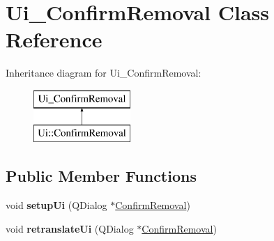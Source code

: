 \hypertarget{class_ui___confirm_removal}{}\section{Ui\+\_\+\+Confirm\+Removal Class Reference}
\label{class_ui___confirm_removal}
Inheritance diagram for Ui\+\_\+\+Confirm\+Removal\+:\begin{figure}[H]
\begin{center}
\leavevmode
\includegraphics[height=2.000000cm]{class_ui___confirm_removal}
\end{center}
\end{figure}
\subsection*{Public Member Functions}
\begin{DoxyCompactItemize}
\item 
\mbox{\label{class_ui___confirm_removal_abce2f0c041471cb5d59d95951211c39e}} 
void {\bfseries setup\+Ui} (Q\+Dialog $\ast$\mbox{\hyperlink{class_confirm_removal}{Confirm\+Removal}})
\item 
\mbox{\label{class_ui___confirm_removal_ae74fdbda054a1bcf67f8146d6b4e6376}} 
void {\bfseries retranslate\+Ui} (Q\+Dialog $\ast$\mbox{\hyperlink{class_confirm_removal}{Confirm\+Removal}})
\end{DoxyCompactItemize}
